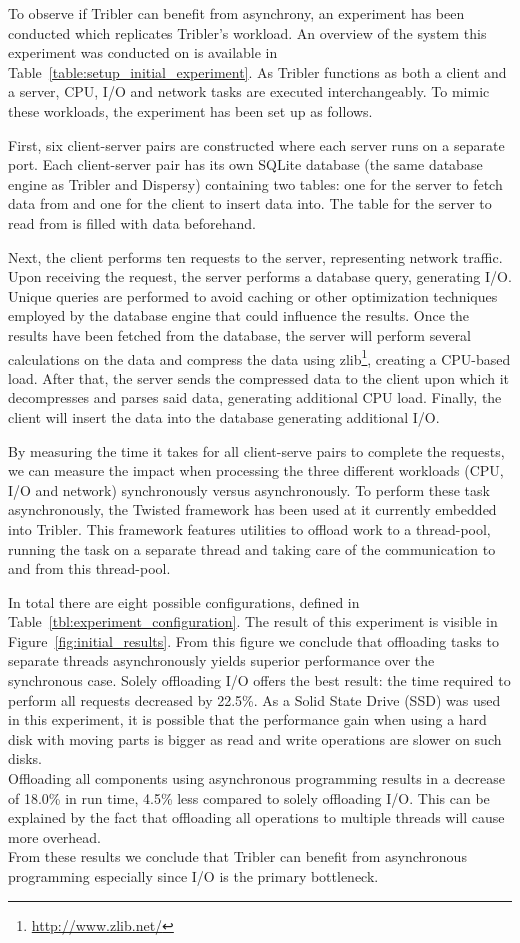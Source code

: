 To observe if Tribler can benefit from asynchrony, an experiment has been conducted which replicates Tribler's workload.
An overview of the system this experiment was conducted on is available in Table~\ref{table:setup_initial_experiment}.
As Tribler functions as both a client and a server, CPU, I/O and network tasks are executed interchangeably.
To mimic these workloads, the experiment has been set up as follows. 

First, six client-server pairs are constructed where each server runs on a separate port.
Each client-server pair has its own SQLite database (the same database engine as Tribler and Dispersy) containing two tables: one for the server to fetch data from and one for the client to insert data into. 
The table for the server to read from is filled with data beforehand.

Next, the client performs ten requests to the server, representing network traffic.
Upon receiving the request, the server performs a database query, generating I/O.
Unique queries are performed to avoid caching or other optimization techniques employed by the database engine that could influence the results.
Once the results have been fetched from the database, the server will perform several calculations on the data and compress the data using zlib\footnote{\url{http://www.zlib.net/}}, creating a CPU-based load.
After that, the server sends the compressed data to the client upon which it decompresses and parses said data, generating additional CPU load.
Finally, the client will insert the data into the database generating additional I/O.

By measuring the time it takes for all client-serve pairs to complete the requests, we can measure the impact when processing the three different workloads (CPU, I/O and network) synchronously versus asynchronously.
To perform these task asynchronously, the Twisted framework has been used at it currently embedded into Tribler.
This framework features utilities to offload work to a thread-pool, running the task on a separate thread and taking care of the communication to and from this thread-pool.

In total there are eight possible configurations, defined in Table~\ref{tbl:experiment_configuration}.
The result of this experiment is visible in Figure~\ref{fig:initial_results}.
From this figure we conclude that offloading tasks to separate threads asynchronously yields superior performance over the synchronous case. Solely offloading I/O offers the best result: the time required to perform all requests decreased by 22.5\%.
As a Solid State Drive (SSD) was used in this experiment, it is possible that the performance gain when using a hard disk with moving parts is bigger as read and write operations are slower on such disks.\\
Offloading all components using asynchronous programming results in a decrease of 18.0\% in run time, 4.5\% less compared to solely offloading I/O.
This can be explained by the fact that offloading all operations to multiple threads will cause more overhead.\\
From these results we conclude that Tribler can benefit from asynchronous programming especially since I/O is the primary bottleneck.

